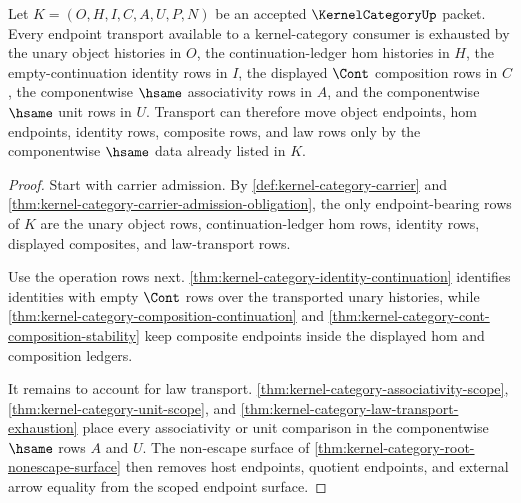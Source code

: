 \begin{theorem}
\label{thm:kernel-category-scoped-endpoint-transport-surface}
Let $K=(O,H,I,C,A,U,P,N)$ be an accepted $\KernelCategoryUp$ packet. Every endpoint transport available to a kernel-category consumer is exhausted by the unary object histories in $O$, the continuation-ledger hom histories in $H$, the empty-continuation identity rows in $I$, the displayed $\Cont$ composition rows in $C$, the componentwise $\hsame$ associativity rows in $A$, and the componentwise $\hsame$ unit rows in $U$. Transport can therefore move object endpoints, hom endpoints, identity rows, composite rows, and law rows only by the componentwise $\hsame$ data already listed in $K$.
\end{theorem}
\begin{proof}
Start with carrier admission. By \autoref{def:kernel-category-carrier} and \autoref{thm:kernel-category-carrier-admission-obligation}, the only endpoint-bearing rows of $K$ are the unary object rows, continuation-ledger hom rows, identity rows, displayed composites, and law-transport rows.

Use the operation rows next. \autoref{thm:kernel-category-identity-continuation} identifies identities with empty $\Cont$ rows over the transported unary histories, while \autoref{thm:kernel-category-composition-continuation} and \autoref{thm:kernel-category-cont-composition-stability} keep composite endpoints inside the displayed hom and composition ledgers.

It remains to account for law transport. \autoref{thm:kernel-category-associativity-scope}, \autoref{thm:kernel-category-unit-scope}, and \autoref{thm:kernel-category-law-transport-exhaustion} place every associativity or unit comparison in the componentwise $\hsame$ rows $A$ and $U$. The non-escape surface of \autoref{thm:kernel-category-root-nonescape-surface} then removes host endpoints, quotient endpoints, and external arrow equality from the scoped endpoint surface.
\end{proof}

